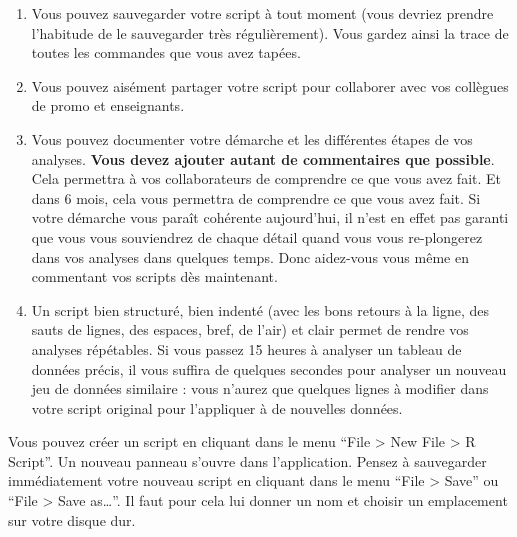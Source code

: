 \documentclass[
  a4paper,
  DIV=11,
  numbers=noendperiod,
  oneside]{scrreprt}
\providecommand{\tightlist}{%
  \setlength{\itemsep}{0pt}\setlength{\parskip}{0pt}}\usepackage{longtable,booktabs,array}
\begin{document}
\begin{enumerate}
\def\labelenumi{\arabic{enumi}.}
\tightlist
\item
  Vous pouvez sauvegarder votre script à tout moment (vous devriez
  prendre l'habitude de le sauvegarder très régulièrement). Vous gardez
  ainsi la trace de toutes les commandes que vous avez tapées.
\item
  Vous pouvez aisément partager votre script pour collaborer avec vos
  collègues de promo et enseignants.
\item
  Vous pouvez documenter votre démarche et les différentes étapes de vos
  analyses. \textbf{Vous devez ajouter autant de commentaires que
  possible}. Cela permettra à vos collaborateurs de comprendre ce que
  vous avez fait. Et dans 6 mois, cela vous permettra de comprendre ce
  que vous avez fait. Si votre démarche vous paraît cohérente
  aujourd'hui, il n'est en effet pas garanti que vous vous souviendrez
  de chaque détail quand vous vous re-plongerez dans vos analyses dans
  quelques temps. Donc aidez-vous vous même en commentant vos scripts
  dès maintenant.
\item
  Un script bien structuré, bien indenté (avec les bons retours à la
  ligne, des sauts de lignes, des espaces, bref, de l'air) et clair
  permet de rendre vos analyses répétables. Si vous passez 15 heures à
  analyser un tableau de données précis, il vous suffira de quelques
  secondes pour analyser un nouveau jeu de données similaire : vous
  n'aurez que quelques lignes à modifier dans votre script original pour
  l'appliquer à de nouvelles données.
\end{enumerate}

Vous pouvez créer un script en cliquant dans le menu ``File
\textgreater{} New File \textgreater{} R Script''. Un nouveau panneau
s'ouvre dans l'application. Pensez à sauvegarder immédiatement votre
nouveau script en cliquant dans le menu ``File \textgreater{} Save'' ou
``File \textgreater{} Save as\ldots{}''. Il faut pour cela lui donner un
nom et choisir un emplacement sur votre disque dur.
\end{document}
